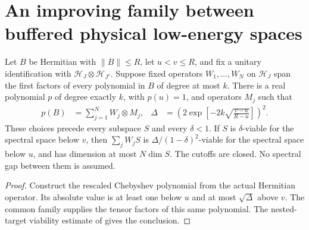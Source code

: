 \section{An improving family between buffered physical low-energy spaces}

\begin{lemma}
    \label{lem:chebyshev_nested_polynomial_family}
    \leanok
    Let $B$ be Hermitian with $\|B\|\le R$, let $u<v\le R$, and fix a
    unitary identification with $\mathcal H_J\otimes\mathcal H_{J^c}$.
    Suppose fixed operators $W_1,\ldots,W_N$ on $\mathcal H_J$ span the
    first factors of every polynomial in $B$ of degree at most $k$.
    There is a real polynomial $p$ of degree exactly $k$, with $p(u)=1$,
    and operators $M_j$ such that
    \begin{align*}
        p(B)   & =\sum_{j=1}^N W_j\otimes M_j,                                &
        \Delta & =\left(2\exp\left[-2k\sqrt{\frac{v-u}{R-u}}\right]\right)^2.
    \end{align*}
    These choices precede every subspace $S$ and every $\delta<1$.
    If $S$ is $\delta$-viable for the spectral space below $v$, then
    $\sum_j W_jS$ is $\Delta/(1-\delta)^2$-viable for the spectral space
    below $u$, and has dimension at most $N\dim S$.
    The cutoffs are closed. No spectral gap between them is assumed.
\end{lemma}

\begin{proof}\leanok
    Construct the rescaled Chebyshev polynomial from the actual Hermitian
    operator. Its absolute value is at least one below $u$ and at most
    $\sqrt\Delta$ above $v$. The common family supplies the tensor factors
    of this same polynomial. The nested-target viability estimate of
    \cite[``Viability reduction between spectral cutoffs'']{QICLean2026Blueprint}
    gives the conclusion.
\end{proof}

